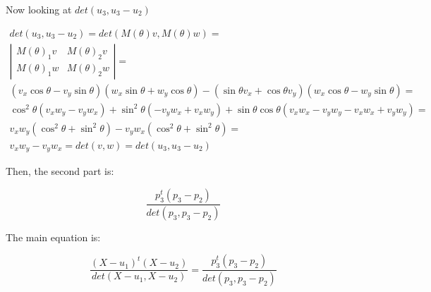 \documentclass{article}
\begin{document}
Now looking at $det(u_3, u_3-u_2)$

\begin{equation}
\begin{split}
det(u_3, u_3-u_2) = det(M(\theta)v, M(\theta)w)=\\
\left|\begin{array}{cc}M(\theta)_1 v & M(\theta)_2v\\ M(\theta)_1 w & M(\theta)_2w\end{array}\right|=\\
(v_x\cos{\theta}-v_y\sin{\theta})(w_x\sin{\theta} + w_y\cos{\theta})-(\sin{\theta}v_x + \cos{\theta}v_y)(w_x\cos{\theta} - w_y\sin{\theta})=\\
\cos^2{\theta}(v_xw_y-v_yw_x)+\sin^2{\theta}(-v_yw_x+v_xw_y) + \sin{\theta}\cos{\theta}(v_xw_x-v_yw_y-v_xw_x+v_yw_y)=\\
v_xw_y(\cos^2{\theta}+\sin^2{\theta}) - v_yw_x(\cos^2{\theta}+\sin^2{\theta})=\\
v_xw_y-v_yw_x=det(v, w) = det(u_3, u_3-u_2)
\end{split}
\end{equation}

Then, the second part is:

\begin{equation}
\dfrac{p_3^t(p_3-p_2)}{det(p_3, p_3-p_2)}
\end{equation}

The main equation is:

\begin{equation}
\dfrac{(X-u_1)^t(X-u_2)}{det(X-u_1, X-u_2)} = \dfrac{p_3^t(p_3-p_2)}{det(p_3, p_3-p_2)}
\end{equation}
\end{document}
